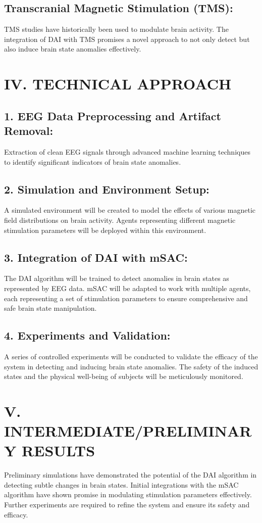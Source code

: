 \documentclass{article}
\begin{document}
\subsection*{Transcranial Magnetic Stimulation (TMS):}
TMS studies have historically been used to modulate brain activity. The integration of DAI with TMS promises a novel approach to not only detect but also induce brain state anomalies effectively.

\section*{IV. TECHNICAL APPROACH}
\subsection*{1. EEG Data Preprocessing and Artifact Removal:}
Extraction of clean EEG signals through advanced machine learning techniques to identify significant indicators of brain state anomalies.

\subsection*{2. Simulation and Environment Setup:}
A simulated environment will be created to model the effects of various magnetic field distributions on brain activity. Agents representing different magnetic stimulation parameters will be deployed within this environment.

\subsection*{3. Integration of DAI with mSAC:}
The DAI algorithm will be trained to detect anomalies in brain states as represented by EEG data. mSAC will be adapted to work with multiple agents, each representing a set of stimulation parameters to ensure comprehensive and safe brain state manipulation.

\subsection*{4. Experiments and Validation:}
A series of controlled experiments will be conducted to validate the efficacy of the system in detecting and inducing brain state anomalies. The safety of the induced states and the physical well-being of subjects will be meticulously monitored.

\section*{V. INTERMEDIATE/PRELIMINARY RESULTS}
Preliminary simulations have demonstrated the potential of the DAI algorithm in detecting subtle changes in brain states. Initial integrations with the mSAC algorithm have shown promise in modulating stimulation parameters effectively. Further experiments are required to refine the system and ensure its safety and efficacy.
\end{document}
